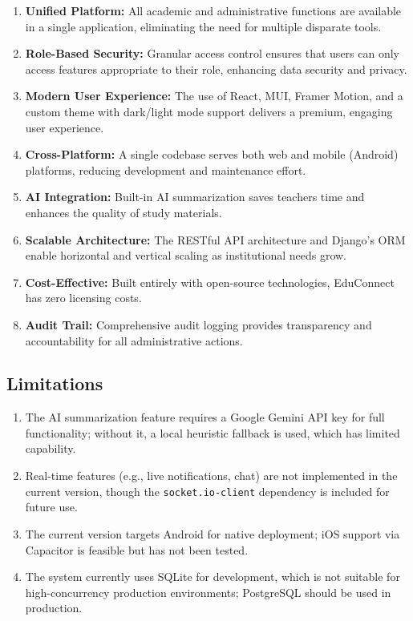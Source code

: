 \begin{enumerate}[label=\arabic*., leftmargin=2em]
    \item \textbf{Unified Platform:} All academic and administrative functions are available in a single application, eliminating the need for multiple disparate tools.
    
    \item \textbf{Role-Based Security:} Granular access control ensures that users can only access features appropriate to their role, enhancing data security and privacy.
    
    \item \textbf{Modern User Experience:} The use of React, MUI, Framer Motion, and a custom theme with dark/light mode support delivers a premium, engaging user experience.
    
    \item \textbf{Cross-Platform:} A single codebase serves both web and mobile (Android) platforms, reducing development and maintenance effort.
    
    \item \textbf{AI Integration:} Built-in AI summarization saves teachers time and enhances the quality of study materials.
    
    \item \textbf{Scalable Architecture:} The RESTful API architecture and Django's ORM enable horizontal and vertical scaling as institutional needs grow.
    
    \item \textbf{Cost-Effective:} Built entirely with open-source technologies, EduConnect has zero licensing costs.
    
    \item \textbf{Audit Trail:} Comprehensive audit logging provides transparency and accountability for all administrative actions.
\end{enumerate}

\subsection{Limitations}

\begin{enumerate}[label=\arabic*., leftmargin=2em]
    \item The AI summarization feature requires a Google Gemini API key for full functionality; without it, a local heuristic fallback is used, which has limited capability.
    
    \item Real-time features (e.g., live notifications, chat) are not implemented in the current version, though the \texttt{socket.io-client} dependency is included for future use.
    
    \item The current version targets Android for native deployment; iOS support via Capacitor is feasible but has not been tested.
    
    \item The system currently uses SQLite for development, which is not suitable for high-concurrency production environments; PostgreSQL should be used in production.
\end{enumerate}
